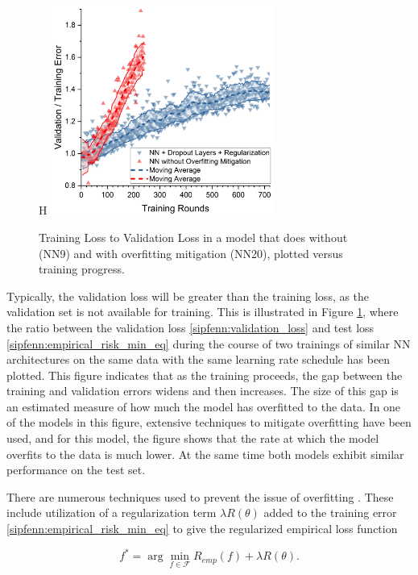 \begin{figure}{H}
    \centering
    \includegraphics[width=0.65\textwidth]{sipfenn/validationtotraining_generalized.png}
    \caption{Training Loss to Validation Loss in a model that does without (NN9) and with overfitting mitigation (NN20), plotted versus training progress.}
    \label{sipfenn:fig:trainingvalidation}
\end{figure}

Typically, the validation loss will be greater than the training loss, as the validation set is not available for training. This is illustrated in Figure \ref{sipfenn:fig:trainingvalidation}, where the ratio between the validation loss \eqref{sipfenn:validation_loss} and test loss \eqref{sipfenn:empirical_risk_min_eq} during the course of two trainings of similar NN architectures on the same data with the same learning rate schedule has been plotted. This figure indicates that as the training proceeds, the gap between the training and validation errors widens and then increases. The size of this gap is an estimated measure of how much the model has overfitted to the data. In one of the models in this figure, extensive techniques to mitigate overfitting have been used, and for this model, the figure shows that the rate at which the model overfits to the data is much lower. At the same time both models exhibit similar performance on the test set.

There are numerous techniques used to prevent the issue of overfitting \cite{hastie2009elements,everitt2002cambridge}. These include utilization of a regularization term $\lambda R(\theta)$ added to the training error \eqref{sipfenn:empirical_risk_min_eq} to give the regularized empirical loss function

\begin{equation}
    f^* = \arg\min_{f\in \mathcal{F}} R_{emp}(f) + \lambda R(\theta).
\end{equation}

